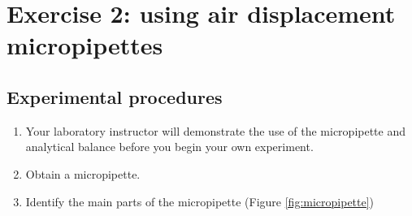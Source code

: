\documentclass[]{book}
\providecommand{\tightlist}{%
  \setlength{\itemsep}{0pt}\setlength{\parskip}{0pt}}
\theoremstyle{definition}
\theoremstyle{definition}
\theoremstyle{definition}
\theoremstyle{remark}
\begin{document}
\section{Exercise 2: using air displacement
micropipettes}\label{exercise-2-using-air-displacement-micropipettes}

\subsection{Experimental procedures}\label{experimental-procedures-5}

\begin{enumerate}
\def\labelenumi{\arabic{enumi}.}
\tightlist
\item
  Your laboratory instructor will demonstrate the use of the
  micropipette and analytical balance before you begin your own
  experiment.
\item
  Obtain a micropipette.
\item
  Identify the main parts of the micropipette (Figure
  \ref{fig:micropipette})


\end{enumerate}
\end{document}

